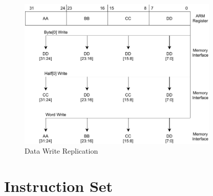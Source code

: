 \begin{figure}[H]
    \centering
    \includegraphics[width=0.85\textwidth]{chapters/2_dlx/images/DLX-MemoryWordReplication.pdf}
    \caption{Data Write Replication}
    \label{figure:dlx:memory_replication}
\end{figure} 

\section{Instruction Set}